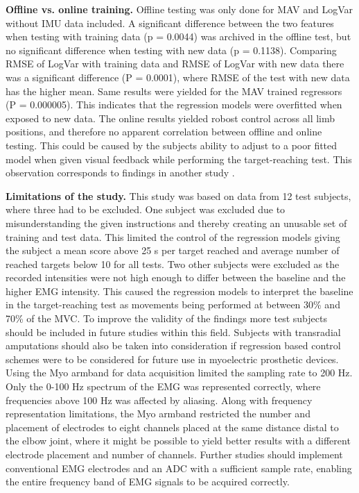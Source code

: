 \begin{multicols}{2}
\textbf{Offline vs. online training.} Offline testing was only done for MAV and LogVar without IMU data included. A significant difference between the two features when testing with training data (p = 0.0044) was archived in the offline test, but no significant difference when testing with new data (p = 0.1138). Comparing RMSE of LogVar with training data and RMSE of LogVar with new data there was a significant difference (P = 0.0001), where RMSE of the test with new data has the higher mean. Same results were yielded for the MAV trained regressors (P = 0.000005). This indicates that the regression models were overfitted when exposed to new data. The online results yielded robost control across all limb positions, and therefore no apparent correlation between offline and online testing. This could be caused by the subjects ability to adjust to a poor fitted model when given visual feedback while performing the target-reaching test. This observation corresponds to findings in another study \cite{jiang2010}.

\textbf{Limitations of the study.} This study was based on data from 12 test subjects, where three had to be excluded. One subject was excluded due to misunderstanding the given instructions and thereby creating an unusable set of training and test data. This limited the control of the regression models giving the subject a mean score above 25 s per target reached and average number of reached targets below 10 for all tests.
Two other subjects were excluded as the recorded intensities were not high enough to differ between the baseline and the higher EMG intensity. This caused the regression models to interpret the baseline in the target-reaching test as movements being performed at between 30\% and 70\% of the MVC. 
To improve the validity of the findings more test subjects should be included in future studies within this field. Subjects with transradial amputations should also be taken into consideration if regression based control schemes were to be considered for future use in myoelectric prosthetic devices. 
Using the Myo armband for data acquisition limited the sampling rate to 200 Hz. Only the 0-100 Hz spectrum of the EMG was represented correctly, where frequencies above 100 Hz was affected by aliasing. Along with frequency representation limitations, the Myo armband restricted the number and placement of electrodes to eight channels placed at the same distance distal to the elbow joint, where it might be possible to yield better results with a different electrode placement and number of channels. Further studies should implement conventional EMG electrodes and an ADC with a sufficient sample rate, enabling the entire frequency band of EMG signals to be acquired correctly.		
	

\end{multicols}
